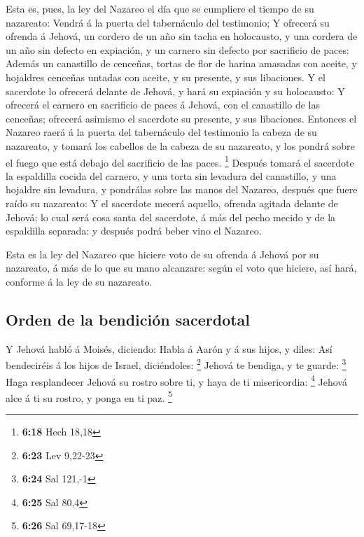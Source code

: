  Esta es, pues, la ley del Nazareo el día que se
cumpliere el tiempo de su nazareato: Vendrá á la puerta del tabernáculo
del testimonio;  Y ofrecerá su ofrenda á Jehová, un
cordero de un año sin tacha en holocausto, y una cordera de un año sin
defecto en expiación, y un carnero sin defecto por sacrificio de paces:
 Además un canastillo de cenceñas, tortas de flor de
harina amasadas con aceite, y hojaldres cenceñas untadas con aceite, y
su presente, y sus libaciones.  Y el sacerdote lo
ofrecerá delante de Jehová, y hará su expiación y su holocausto:
 Y ofrecerá el carnero en sacrificio de paces á Jehová,
con el canastillo de las cenceñas; ofrecerá asimismo el sacerdote su
presente, y sus libaciones.  Entonces el Nazareo raerá á
la puerta del tabernáculo del testimonio la cabeza de su nazareato, y
tomará los cabellos de la cabeza de su nazareato, y los pondrá sobre el
fuego que está debajo del sacrificio de las paces. \footnote{\textbf{6:18}
  Hech 18,18}  Después tomará el sacerdote la espaldilla
cocida del carnero, y una torta sin levadura del canastillo, y una
hojaldre sin levadura, y pondrálas sobre las manos del Nazareo, después
que fuere raído su nazareato:  Y el sacerdote mecerá
aquello, ofrenda agitada delante de Jehová; lo cual será cosa santa del
sacerdote, á más del pecho mecido y de la espaldilla separada: y después
podrá beber vino el Nazareo.

 Esta es la ley del Nazareo que hiciere voto de su
ofrenda á Jehová por su nazareato, á más de lo que su mano alcanzare:
según el voto que hiciere, así hará, conforme á la ley de su nazareato.

\hypertarget{orden-de-la-bendiciuxf3n-sacerdotal}{%
\subsection{Orden de la bendición
sacerdotal}\label{orden-de-la-bendiciuxf3n-sacerdotal}}

 Y Jehová habló á Moisés, diciendo:  Habla
á Aarón y á sus hijos, y diles: Así bendeciréis á los hijos de Israel,
diciéndoles: \footnote{\textbf{6:23} Lev 9,22-23}  Jehová
te bendiga, y te guarde: \footnote{\textbf{6:24} Sal 121,-1}
 Haga resplandecer Jehová su rostro sobre ti, y haya de
ti misericordia: \footnote{\textbf{6:25} Sal 80,4} 
Jehová alce á ti su rostro, y ponga en ti paz. \footnote{\textbf{6:26}
  Sal 69,17-18}


